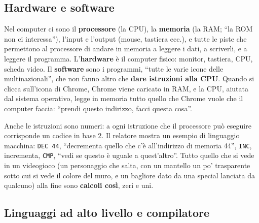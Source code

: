 \subsection{Hardware e software}

Nel computer ci sono il \textbf{processore} (la CPU), la \textbf{memoria} (la
RAM; ``la ROM non ci interessa''), l'input e l'output (mouse, tastiera ecc.),
e tutte le piste che permettono al processore di andare in memoria a leggere
i dati, a scriverli, e a leggere il programma. L'\textbf{hardware} è il
computer fisico: monitor, tastiera, CPU, scheda video. Il \textbf{software}
sono i programmi, ``tutte le varie icone delle multinazionali'', che non fanno
altro che \textbf{dare istruzioni alla CPU}. Quando si clicca sull'icona di
Chrome, Chrome viene caricato in RAM, e la CPU, aiutata dal sistema operativo,
legge in memoria tutto quello che Chrome vuole che il computer faccia:
``prendi questo indirizzo, facci questa cosa''.

Anche le istruzioni sono numeri: a ogni istruzione che il processore può
eseguire corrisponde un codice in base 2. Il relatore mostra un esempio di
linguaggio macchina: \texttt{DEC 44}, ``decrementa quello che c'è
all'indirizzo di memoria 44'', \texttt{INC}, incrementa, \texttt{CMP},
``vedi se questo è uguale a quest'altro''. Tutto quello che si vede in un
videogioco (un personaggio che salta, con un mantello un po' trasparente
sotto cui si vede il colore del muro, e un bagliore dato da una special
lanciata da qualcuno) alla fine sono \textbf{calcoli così}, zeri e uni.

\subsection{Linguaggi ad alto livello e compilatore}

